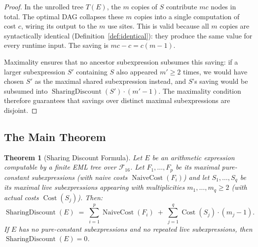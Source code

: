 \documentclass[12pt,a4paper]{article}
\newtheorem{theorem}{Theorem}[section]
\theoremstyle{definition}
\newcommand{\Cost}{\operatorname{Cost}}
\newcommand{\NC}{\operatorname{NaiveCost}}
\newcommand{\SD}{\operatorname{SharingDiscount}}
\begin{document}
\begin{proof}
In the unrolled tree $T(E)$, the $m$ copies of $S$ contribute $mc$ nodes
in total.  The optimal DAG collapses these $m$ copies into a single
computation of cost $c$, wiring its output to the $m$ use sites.  This
is valid because all $m$ copies are syntactically identical
(Definition~\ref{def:identical}): they produce the same value for every
runtime input.  The saving is $mc - c = c(m-1)$.

Maximality ensures that no ancestor subexpression subsumes this saving:
if a larger subexpression $S'$ containing $S$ also appeared $m' \geq 2$
times, we would have chosen $S'$ as the maximal shared subexpression
instead, and $S$'s saving would be subsumed into $\SD(S') \cdot (m'-1)$.
The maximality condition therefore guarantees that savings over distinct
maximal subexpressions are disjoint.
\end{proof}

\subsection{The Main Theorem}

\begin{theorem}[Sharing Discount Formula]
\label{thm:SDF}
Let $E$ be an arithmetic expression computable by a finite EML tree over
$\mathcal{F}_{16}$.  Let $F_1, \ldots, F_p$ be its maximal pure-constant
subexpressions (with naive costs $\NC(F_i)$) and let $S_1, \ldots, S_q$
be its maximal live subexpressions appearing with multiplicities
$m_1, \ldots, m_q \geq 2$ (with actual costs $\Cost(S_j)$).  Then:
\[
  \boxed{
  \SD(E) \;=\;
    \sum_{i=1}^{p} \NC(F_i)
  \;+\;
    \sum_{j=1}^{q} \Cost(S_j) \cdot (m_j - 1).
  }
\]
If $E$ has no pure-constant subexpressions and no repeated live
subexpressions, then $\SD(E) = 0$.
\end{theorem}
\end{document}
